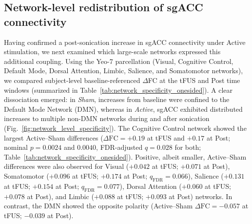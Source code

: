     \subsection*{Network-level redistribution of sgACC connectivity}
    \noindent
    Having confirmed a post-sonication increase in sgACC connectivity under Active stimulation, we next examined which large-scale networks expressed this additional coupling. Using the Yeo-7 parcellation \cite{yeo2011organization} (Visual, Cognitive Control, Default Mode, Dorsal Attention, Limbic, Salience, and Somatomotor networks), we compared subject-level baseline-referenced $\Delta$FC at the tFUS and Post time windows (summarized in Table~\ref{tab:network_specificity_onesided}). A clear dissociation emerged: in \emph{Sham}, increases from baseline were confined to the Default Mode Network (DMN), whereas in \emph{Active}, sgACC exhibited distributed increases to multiple non-DMN networks during and after sonication (Fig.~\ref{fig:network_level_specificity}). The Cognitive Control network showed the largest Active--Sham differences ($\Delta\mathrm{FC} = +0.19$ at tFUS and $+0.17$ at Post; nominal $p=0.0024$ and $0.0040$, FDR-adjusted $q=0.028$ for both; Table~\ref{tab:network_specificity_onesided}). Positive, albeit smaller, Active--Sham differences were also observed for Visual ($+0.042$ at tFUS; $+0.071$ at Post), Somatomotor ($+0.096$ at tFUS; $+0.174$ at Post; $q_{\mathrm{FDR}}=0.066$), Salience ($+0.131$ at tFUS; $+0.154$ at Post; $q_{\mathrm{FDR}}=0.077$), Dorsal Attention ($+0.060$ at tFUS; $+0.078$ at Post), and Limbic ($+0.088$ at tFUS; $+0.093$ at Post) networks. In contrast, the DMN showed the opposite polarity (Active--Sham $\Delta\mathrm{FC}=-0.057$ at tFUS; $-0.039$ at Post). 

